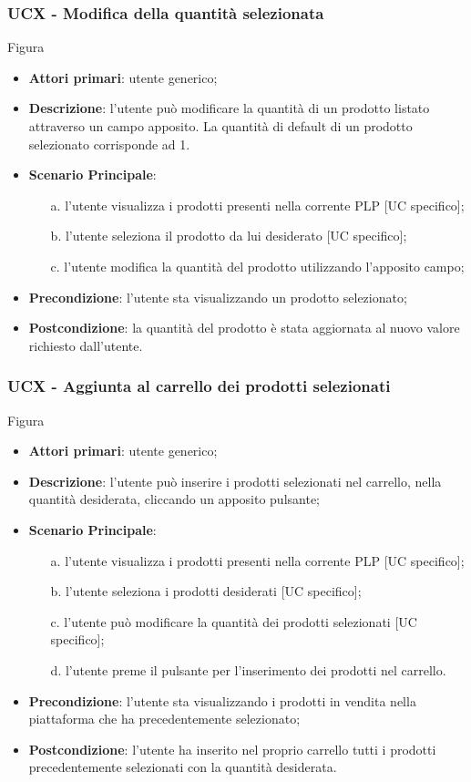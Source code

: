 \subsubsection{UCX - Modifica della quantità selezionata}
Figura \\
\begin{itemize}
\item \textbf{Attori primari}: utente generico;
\item \textbf{Descrizione}: l'utente può modificare la quantità di un prodotto listato attraverso un campo apposito. La quantità di default di un prodotto selezionato corrisponde ad 1.
\item \textbf{Scenario Principale}:
\begin{enumerate}
\item[a.] l'utente visualizza i prodotti presenti nella corrente PLP [UC specifico];
\item[b.] l'utente seleziona il prodotto da lui desiderato [UC specifico];
\item[c.] l'utente modifica la quantità del prodotto utilizzando l'apposito campo;
\end{enumerate}
\item \textbf{Precondizione}: l'utente sta visualizzando un prodotto selezionato;
\item \textbf{Postcondizione}: la quantità del prodotto è stata aggiornata al nuovo valore richiesto dall'utente.
\end{itemize}
\subsubsection{UCX - Aggiunta al carrello dei prodotti selezionati}
Figura \\
\begin{itemize}
\item \textbf{Attori primari}: utente generico;
\item \textbf{Descrizione}: l'utente può inserire i prodotti selezionati nel carrello, nella quantità desiderata, cliccando un apposito pulsante;
\item \textbf{Scenario Principale}:
\begin{enumerate}
\item[a.] l'utente visualizza i prodotti presenti nella corrente PLP [UC specifico];
\item[b.] l'utente seleziona i prodotti desiderati [UC specifico];
\item[c.] l'utente può modificare la quantità dei prodotti selezionati [UC specifico];
\item[d.] l'utente preme il pulsante per l'inserimento dei prodotti nel carrello.
\end{enumerate}
\item \textbf{Precondizione}: l'utente sta visualizzando i prodotti in vendita nella piattaforma che ha precedentemente selezionato;
\item \textbf{Postcondizione}: l'utente ha inserito nel proprio carrello tutti i prodotti precedentemente selezionati con la quantità desiderata.
\end{itemize}
